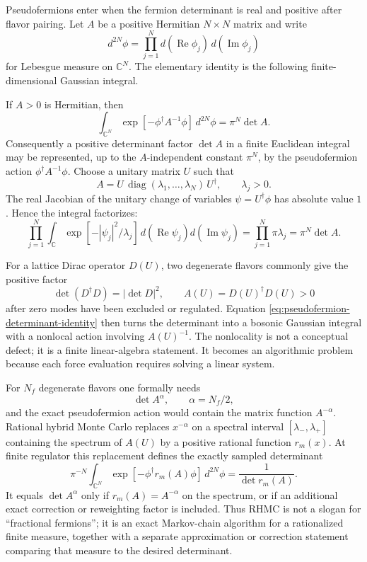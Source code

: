 Pseudofermions enter when the fermion determinant is real and positive after
flavor pairing.  Let \(A\) be a positive Hermitian \(N\times N\) matrix and
write
\[
  d^{2N}\phi=\prod_{j=1}^N d(\operatorname{Re}\phi_j)\,
  d(\operatorname{Im}\phi_j)
\]
for Lebesgue measure on \(\mathbb C^N\).  The elementary identity is the
following finite-dimensional Gaussian integral.

If \(A>0\) is Hermitian, then
\begin{equation}
  \int_{\mathbb C^N}
  \exp[-\phi^\dagger A^{-1}\phi]\,d^{2N}\phi
  =
  \pi^N\det A .
  \label{eq:pseudofermion-determinant-identity}
\end{equation}
Consequently a positive determinant factor \(\det A\) in a finite Euclidean
integral may be represented, up to the \(A\)-independent constant \(\pi^N\),
by the pseudofermion action \(\phi^\dagger A^{-1}\phi\).
Choose a unitary matrix \(U\) such that
\[
  A=U\,\operatorname{diag}(\lambda_1,\ldots,\lambda_N)\,U^\dagger,
  \qquad \lambda_j>0.
\]
The real Jacobian of the unitary change of variables \(\psi=U^\dagger\phi\)
has absolute value \(1\).  Hence the integral factorizes:
\[
  \prod_{j=1}^N
  \int_{\mathbb C}\exp[-|\psi_j|^2/\lambda_j]\,
  d(\operatorname{Re}\psi_j)d(\operatorname{Im}\psi_j)
  =
  \prod_{j=1}^N \pi\lambda_j
  =
  \pi^N\det A.
\]

For a lattice Dirac operator \(D(U)\), two degenerate flavors commonly give
the positive factor
\[
  \det(D^\dagger D)=|\det D|^2,
  \qquad A(U)=D(U)^\dagger D(U)>0
\]
after zero modes have been excluded or regulated.  Equation
\eqref{eq:pseudofermion-determinant-identity} then turns the determinant
into a bosonic Gaussian integral with a nonlocal action involving
\(A(U)^{-1}\).  The nonlocality is not a conceptual defect; it is a finite
linear-algebra statement.  It becomes an algorithmic problem because each
force evaluation requires solving a linear system.

For \(N_f\) degenerate flavors one formally needs
\[
  \det A^{\alpha},
  \qquad \alpha=N_f/2,
\]
and the exact pseudofermion action would contain the matrix function
\(A^{-\alpha}\).  Rational hybrid Monte Carlo replaces \(x^{-\alpha}\) on a
spectral interval \([\lambda_-,\lambda_+]\) containing the spectrum of
\(A(U)\) by a positive rational function \(r_m(x)\).  At finite regulator
this replacement defines the exactly sampled determinant
\begin{equation}
  \pi^{-N}
  \int_{\mathbb C^N}
  \exp[-\phi^\dagger r_m(A)\phi]\,d^{2N}\phi
  =
  \frac{1}{\det r_m(A)}.
  \label{eq:rhmc-rationalized-determinant}
\end{equation}
It equals \(\det A^\alpha\) only if \(r_m(A)=A^{-\alpha}\) on the spectrum,
or if an additional exact correction or reweighting factor is included.
Thus RHMC is not a slogan for ``fractional fermions''; it is an exact
Markov-chain algorithm for a rationalized finite measure, together with a
separate approximation or correction statement comparing that measure to the
desired determinant.

